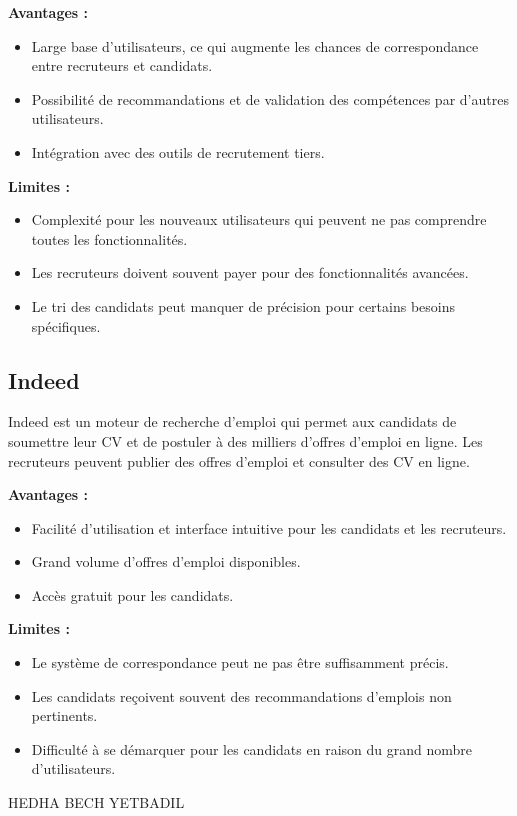 \documentclass[12pt, letterpaper]{article}
\begin{document}
\textbf{Avantages :}
\begin{itemize}
    \item Large base d'utilisateurs, ce qui augmente les chances de correspondance entre recruteurs et candidats.
    \item Possibilité de recommandations et de validation des compétences par d'autres utilisateurs.
    \item Intégration avec des outils de recrutement tiers.
\end{itemize}

\textbf{Limites :}
\begin{itemize}
    \item Complexité pour les nouveaux utilisateurs qui peuvent ne pas comprendre toutes les fonctionnalités.
    \item Les recruteurs doivent souvent payer pour des fonctionnalités avancées.
    \item Le tri des candidats peut manquer de précision pour certains besoins spécifiques.
\end{itemize}

\subsection{Indeed}
Indeed est un moteur de recherche d'emploi qui permet aux candidats de soumettre leur CV et de postuler à des milliers d'offres d'emploi en ligne. Les recruteurs peuvent publier des offres d'emploi et consulter des CV en ligne.

\textbf{Avantages :}
\begin{itemize}
    \item Facilité d'utilisation et interface intuitive pour les candidats et les recruteurs.
    \item Grand volume d'offres d'emploi disponibles.
    \item Accès gratuit pour les candidats.
\end{itemize}

\textbf{Limites :}
\begin{itemize}
    \item Le système de correspondance peut ne pas être suffisamment précis.
    \item Les candidats reçoivent souvent des recommandations d'emplois non pertinents.
    \item Difficulté à se démarquer pour les candidats en raison du grand nombre d'utilisateurs.
\end{itemize}
HEDHA BECH YETBADIL
\end{document}
